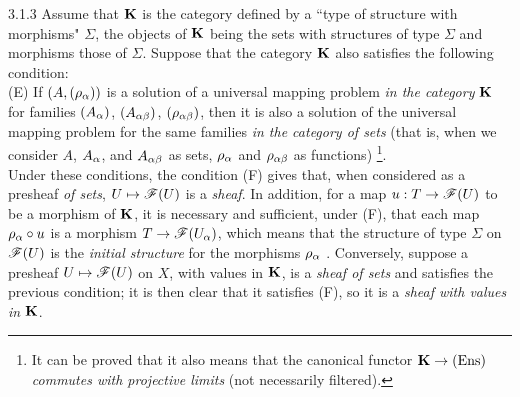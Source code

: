 \documentclass[../main.tex]{subfiles}
\begin{document}
\begin{cx}{3.1.3}
Assume that $\mathbf{K}$ is the category defined by a ``type of structure
with morphisms" $\Sigma$, the objects of $\mathbf{K}$ being the sets with structures
of type $\Sigma$ and morphisms those of $\Sigma$. Suppose that the category $\mathbf{K}$ also satisfies
the following condition:\\

(E) If $(A,(\rho_\alpha))$ is a solution of a universal mapping problem \emph{in the category} $\mathbf{K}$
for families $(A_\alpha)$, $(A_{\alpha\beta})$, $(\rho_{\alpha\beta})$, then it is also a solution of the
universal mapping problem for the same families \emph{in the category of sets} (that is, when we
consider $A$, $A_\alpha$, and $A_{\alpha\beta}$ as sets, $\rho_\alpha$ and $\rho_{\alpha\beta}$ as functions)
\footnote{It can be proved that it also means that the canonical functor $\mathbf{K}\to(\mathrm{Ens})$
\emph{commutes with projective limits} (not necessarily filtered).}.\\

Under these conditions, the condition (F) gives that, when considered as a presheaf
\emph{of sets}, $U\mapsto\mathscr{F}(U)$ is a \emph{sheaf}. In addition, for a map $u:T\to\mathscr{F}(U)$
to be a morphism of $\mathbf{K}$, it is necessary and sufficient, under (F), that each map $\rho_\alpha\circ u$
is a morphism $T\to\mathscr{F}(U_\alpha)$, which means that the structure of type $\Sigma$ on $\mathscr{F}(U)$
is the \emph{initial structure} for the morphisms $\rho_\alpha$ . Conversely, suppose a presheaf
$U\mapsto\mathscr{F}(U)$ on $X$, with values in $\mathbf{K}$, is a \emph{sheaf of sets} and satisfies the previous
condition; it is then clear that it satisfies (F), so it is a \emph{sheaf with values in} $\mathbf{K}$.
\end{cx}
\end{document}
